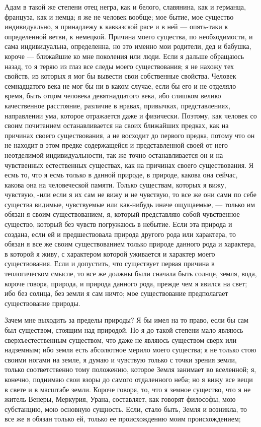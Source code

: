 \documentclass[12pt]{article}
\begin{document}
Адам в такой же степени отец негра, как и белого, славянина, как и германца, француза, как и немца; я же не человек вообще; мое бытие, мое существо индивидуально, я принадлежу к кавказской расе и в ней --- опять-таки к определенной ветви, к немецкой. Причина моего существа, по необходимости, и сама индивидуальна, определенна, но это именно мои родители, дед и бабушка, короче --- ближайшие ко мне поколения или люди. Если я дальше обращаюсь назад, то я теряю из глаз все следы моего существования; я не нахожу тех свойств, из которых я мог бы вывести свои собственные свойства. Человек семнадцатого века не мог бы ни в каком случае, если бы его и не отделяло время, быть отцом человека девятнадцатого века, ибо слишком велико качественное расстояние, различие в нравах, привычках, представлениях, направлении ума, которое отражается даже и физически. Поэтому, как человек со своим почитанием останавливается на своих ближайших предках, как на причинах своего существования, а не восходит до первого предка, потому что он не находит в этом предке содержащейся и представленной своей от него неотделимой индивидуальности, так же точно останавливается он и на чувственных естественных существах, как на причинах своего существования. Я есмь то, что я есмь только в данной природе, в природе, какова она сейчас, какова она на человеческой памяти. Только существам, которых я вижу, чувствую, -или если я их сам не вижу и не чувствую, то все же они сами по себе существа видимые, чувствуемые или как-нибудь иначе ощущаемые, --- только им обязан я своим существованием, я, который представляю собой чувственное существо, который без чувств погружаюсь в небытие. Если эта природа и создана, если ей и предшествовала природа другого рода или характера, то обязан я все же своим существованием только природе данного рода и характера, в которой я живу, с характером которой уживается и характер моего существования. Если и допустить, что существует первая причина в теологическом смысле, то все же должны были сначала быть солнце, земля, вода, короче говоря, природа, и природа данного рода, прежде чем я явился на свет; ибо без солнца, без земли я сам ничто; мое существование предполагает существование природы. 

Зачем мне выходить за пределы природы? Я бы имел на то право, если бы сам был существом, стоящим над природой. Но я до такой степени мало являюсь сверхъестественным существом, что даже не являюсь существом сверх или надземным; ибо земля есть абсолютное мерило моего существа; я не только стою своими ногами на земле, я думаю и чувствую только с точки зрения земли, только соответственно тому положению, которое Земля занимает во вселенной; я, конечно, поднимаю свои взоры до самого отдаленного неба; но я вижу все вещи в свете и в масштабе земли. Короче говоря, то, что я земное существо, что я не житель Венеры, Меркурия, Урана, составляет, как говорят философы, мою субстанцию, мою основную сущность. Если, стало быть, Земля и возникла, то все же я обязан только ей, только ее происхождению моим происхождением; 
\end{document}
